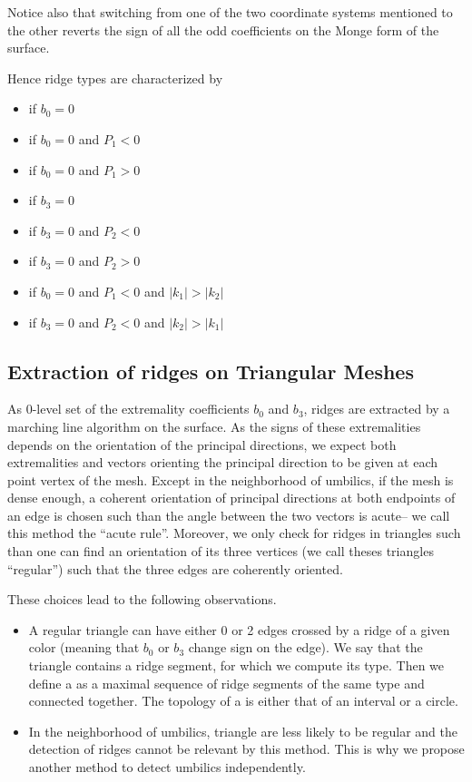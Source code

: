 \noindent Notice also that switching from one of the two coordinate systems
mentioned to the other reverts the sign of all the odd
coefficients on the Monge form of the surface.
\medskip

Hence ridge types are characterized by 
\begin{itemize}
\item
{} if $b_0=0$
\item
{} if  $b_0=0$ and $P_1<0$
\item
  if  $b_0=0$ and $P_1>0$
\item
  if  $b_3=0$
\item
  if  $b_3=0$ and $P_2<0$
\item
{} if  $b_3=0$ and $P_2>0$
\item
{} if  $b_0=0$  and $P_1<0$ and $|k_1|>|k_2|$
\item
{} if  $b_3=0$ and $P_2<0$ and $|k_2|>|k_1|$
\end{itemize}


\subsection{Extraction of ridges on Triangular Meshes}

As 0-level set of the extremality coefficients $b_0$ and $b_3$, ridges
are extracted by a marching line algorithm on the surface.  As the
signs of these extremalities depends on the orientation of the
principal directions, we expect both extremalities and vectors
orienting the principal direction to be given at each point vertex of
the mesh. Except in the neighborhood of umbilics, if the mesh is dense
enough, a coherent orientation of principal directions at both
endpoints of an edge is chosen such than the angle between the two
vectors is acute-- we call this method the ``acute rule''. Moreover,
we only check for ridges in triangles such than one can find an
orientation of its three vertices (we call theses triangles
``regular'') such that the three edges are coherently oriented.

These choices lead to the following observations.
\begin{itemize}
\item
A regular triangle can have either 0 or 2 edges crossed by a ridge of
a given color (meaning that $b_0$ or $b_3$ change sign on the
edge). We say that the triangle contains a ridge segment, for which we
compute its type.  Then we define a
 as a maximal sequence of ridge segments of the 
same type and connected together.  The topology of a 
is either that of an interval or a circle.
\item
In the neighborhood of umbilics, triangle are less likely to be
regular and the detection of ridges cannot be relevant by this method.
This is why we propose another method to detect umbilics
independently.
\end{itemize}



